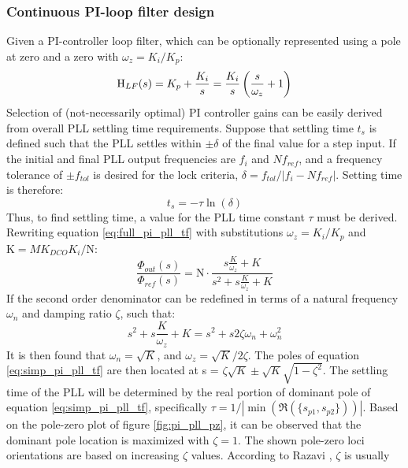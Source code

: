 		\subsubsection{Continuous PI-loop filter design}\label{cont_pi_filt_des}
			Given a PI-controller loop filter, which can be optionally represented using a pole at zero and a zero with $\omega_z = K_i/K_p$:
			\begin{equation} \label{eq:pi_pll_tf}
				\textnormal{H}_{LF}(s) = K_p + \frac{K_i}{s}  = \frac{K_i}{s}\left(\frac{s}{\omega_z} + 1\right) 
			\end{equation}
			Selection of (not-necessarily optimal) PI controller gains can be easily derived from overall PLL settling time requirements. Suppose that settling time $t_s$ is defined such that the PLL settles within $\pm \delta$ of the final value for a step input. If the initial and final PLL output frequencies are $f_i$ and $Nf_{ref}$, and a frequency tolerance of $\pm f_{tol}$ is desired for the lock criteria,  $\delta = f_{tol}/|f_i - Nf_{ref}|$. Setting time is therefore:
			\begin{equation}
				t_s = -\tau\ln(\delta)
			\end{equation}
			Thus, to find settling time, a value for the PLL time constant $\tau$ must be derived. Rewriting equation \ref{eq:full_pi_pll_tf} with substitutions $\omega_z = K_i/K_p$ and $\mathrm{K} = MK_{DCO}K_i/\mathrm{N}$:
			\begin{equation} \label{eq:simp_pi_pll_tf}
				\frac{\Phi_{out}(s)}{\Phi_{ref}(s)} = \mathrm{N}\cdot\frac{s\frac{K}{\omega_z} + K }{s^2 + s\frac{K}{\omega_z} + K}
			\end{equation}
			If the second order denominator can be redefined in terms of a natural frequency $\omega_n$ and damping ratio $\zeta$, such that:
			\begin{equation}
				s^2 + s\frac{K}{\omega_z} + K = s^2 + s2\zeta\omega_n + \omega_n^2
			\end{equation}
			It is then found that $\omega_n = \sqrt{K}$, and $\omega_z = \sqrt{K}/2\zeta$. The poles of equation \ref{eq:simp_pi_pll_tf} are then located at s = $\zeta\sqrt{K} \pm \sqrt{K}\sqrt{1-\zeta^2}$.
			The settling time of the PLL will be determined by the real portion of dominant pole of equation \ref{eq:simp_pi_pll_tf}, specifically $\tau = 1/|\min(\Re(\{s_{p1}, s_{p2}\}))|$. Based on the pole-zero plot of figure \ref{fig:pi_pll_pz}, it can be observed that the dominant pole location is maximized with $\zeta=1$. The shown pole-zero loci orientations are based on increasing $\zeta$ values. According to Razavi \cite{razavi_2017}, $\zeta$ is usually 

